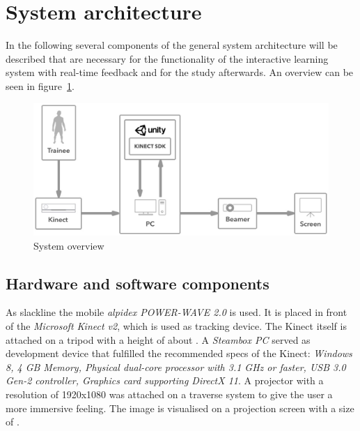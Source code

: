 \section{System architecture}\label{5_3_systemArchitecture \todo{hier stehengebleiben}}
In the following several components of the general system architecture will be described that are necessary for the functionality of the interactive learning system with real-time feedback and for the study afterwards. An overview can be seen in figure~\ref{fig:5_3_systemArchitecture}.
\begin{figure}[htb]
	\centering
	\begin{minipage}[t]{1\linewidth}
		\centering
		\includegraphics[width=1\linewidth]{Pictures/5_3_systemArchitecture}
		\caption{System overview}
		\label{fig:5_3_systemArchitecture}
	\end{minipage}
\end{figure}

\subsection{Hardware and software components}

As slackline the mobile \textit{alpidex POWER-WAVE 2.0} is used. It is placed in front of the \textit{Microsoft Kinect v2}, which is used as tracking device. The Kinect itself is attached on a  tripod with a height of about . A \textit{Steambox PC}  served as development device that fulfilled the recommended specs of the Kinect: \textit{Windows 8, 4 GB Memory, Physical dual-core processor with 3.1 GHz or faster, USB 3.0 Gen-2 controller, Graphics card supporting DirectX 11}. A projector  with a resolution of 1920x1080 was attached on a traverse system to give the user a more immersive feeling. The image is visualised on a projection screen with a size of .


